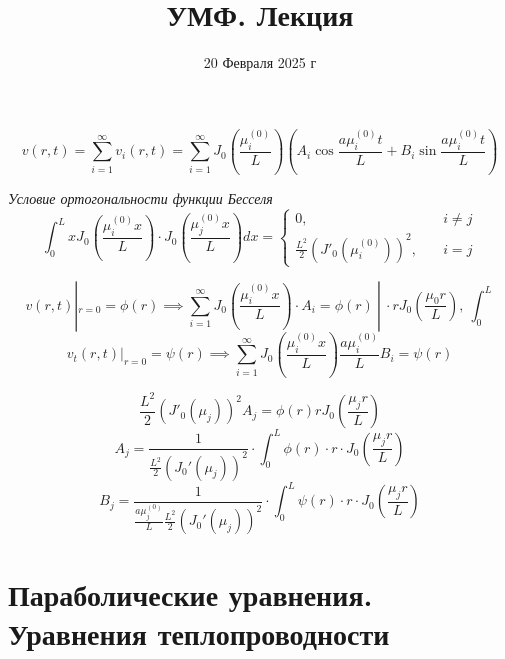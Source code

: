 \documentclass[a4paper]{article}
\theoremstyle{definition}
\begin{document}
\title{УМФ. Лекция}
\author{}
\date{20 Февраля 2025 г}
\maketitle

\begin{equation}
    v(r,t) = \sum_{i=1}^{\infty} v_i(r,t) = \sum_{i=1}^{\infty} J_0\left(\frac{\mu_i^{(0)}}{L} 
    \right) \left( A_i \cos \frac{a\mu_i^{(0)} t}{L} + B_i 
    \sin\frac{a\mu_i^{(0)} t}{L}\right)
\end{equation}

\begin{tcolorbox}
    \emph{Условие ортогональности функции Бесселя}
    \begin{equation}
        \int_{0}^{L} x J_0 \left( \frac{\mu_i^{(0)}x}{L} \right)\cdot
        J_0\left(\frac{\mu_j^{(0)}x}{L}\right) dx =
        \begin{cases}
            0, &\quad i \neq j \\
            \frac{L^2}{2} (J'_0 (\mu_i^{(0)}))^2, &\quad i = j
        \end{cases}
    \end{equation}
\end{tcolorbox}

\[
    v(r,t) |_{r=0} = \phi(r) \implies \sum_{i=1}^{\infty} J_0 \left(\frac{\mu_i^{(0)}x}{L}\right)
    \cdot A_i = \phi(r) \ | \ \cdot r J_0 \left(\frac{\mu_0 r}{L} \right), \
    \int_{0}^{L} 
\]
\[
    v_t(r,t) |_{r=0} = \psi(r) \implies \sum_{i=1}^{\infty} J_0 \left(\frac{\mu_i^{(0)}x}{L}\right)
    \frac{a \mu_i^{(0)}}{L} B_i = \psi(r)
\]

\[
    \frac{L^2}{2}(J'_0(\mu_j))^2 A_j = \phi(r) r J_0 \left(\frac{\mu_j r}{L} \right)
\]
\begin{equation}
    A_j = \frac{1}{\frac{L^2}{2}(J_0'(\mu_j))^2 } \cdot \int_{0}^{L} 
    \phi(r) \cdot r \cdot J_0 \left(\frac{\mu_j r}{L} \right)
\end{equation}
\begin{equation}
    B_j = \frac{1}{\frac{a \mu_j^{(0)}}{L}\frac{L^2}{2}(J_0'(\mu_j))^2  } 
    \cdot \int_{0}^{L} \psi(r) \cdot r \cdot J_0 \left(\frac{\mu_j r}{L} \right)
\end{equation}

\section*{\centering Параболические уравнения. Уравнения теплопроводности}
\end{document}

